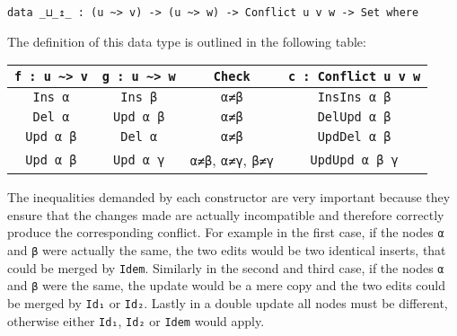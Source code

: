 \documentclass[preprint]{sigplanconf}
\begin{document}
\begin{verbatim}
data _⊔_↥_ : (u ~> v) -> (u ~> w) -> Conflict u v w -> Set where
\end{verbatim}
	 The definition of this data type is outlined in the following table: 
\begin{table}[h]
\centering
\begin{tabular}{| c | c | c | c |}
\hline
\texttt{f : u \textasciitilde> v} & \texttt{g : u \textasciitilde> w} & \texttt{Check} & \texttt{c : Conflict u v w} \\ \hline
\texttt{Ins α} & \texttt{Ins β} & \texttt{α≠β} & \texttt{InsIns α β} \\ \hline
\texttt{Del α} & \texttt{Upd α β} & \texttt{α≠β} & \texttt{DelUpd α β} \\ \hline
\texttt{Upd α β} & \texttt{Del α} & \texttt{α≠β} & \texttt{UpdDel α β} \\ \hline
\texttt{Upd α β} & \texttt{Upd α γ} & \texttt{α≠β}, \texttt{α≠γ}, \texttt{β≠γ} & \texttt{UpdUpd α β γ} \\ \hline
\end{tabular}
\end{table}


	The inequalities demanded by each constructor are very important 
	because they ensure that the changes made are actually incompatible and 
	therefore correctly produce the corresponding conflict.
	For example in the first case, if the nodes \texttt{α} and \texttt{β} were 
	actually the same, the two edits would be two identical inserts, that 
	could be merged 	by \texttt{Idem}. Similarly in the second and third case, if 
	the nodes	 \texttt{α} and \texttt{β} were the same, the update would be a 
	mere copy and the two edits could be merged by \texttt{Id₁} or \texttt{Id₂}. 
	Lastly in a double update all nodes must be different, otherwise
	either \texttt{Id₁}, \texttt{Id₂} or \texttt{Idem} would apply.
	
\end{document}
